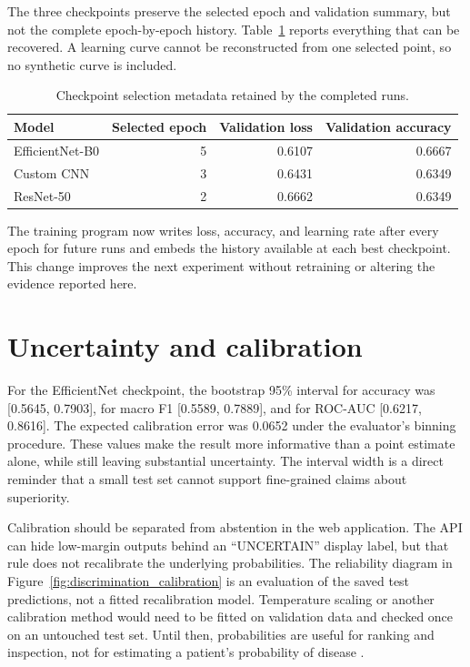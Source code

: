 The three checkpoints preserve the selected epoch and validation summary, but not the complete epoch-by-epoch history. Table~\ref{tab:checkpoint_selection} reports everything that can be recovered. A learning curve cannot be reconstructed from one selected point, so no synthetic curve is included.

\begin{table}[htbp]
\centering
\caption{Checkpoint selection metadata retained by the completed runs.}
\label{tab:checkpoint_selection}
\begin{tabular}{@{}lrrr@{}}
\toprule
\textbf{Model} & \textbf{Selected epoch} & \textbf{Validation loss} & \textbf{Validation accuracy} \\
\midrule
EfficientNet-B0 & 5 & 0.6107 & 0.6667 \\
Custom CNN & 3 & 0.6431 & 0.6349 \\
ResNet-50 & 2 & 0.6662 & 0.6349 \\
\bottomrule
\end{tabular}
\end{table}

The training program now writes loss, accuracy, and learning rate after every epoch for future runs and embeds the history available at each best checkpoint. This change improves the next experiment without retraining or altering the evidence reported here.

\section{Uncertainty and calibration}
For the EfficientNet checkpoint, the bootstrap 95\% interval for accuracy was [0.5645, 0.7903], for macro F1 [0.5589, 0.7889], and for ROC-AUC [0.6217, 0.8616]. The expected calibration error was 0.0652 under the evaluator's binning procedure. These values make the result more informative than a point estimate alone, while still leaving substantial uncertainty. The interval width is a direct reminder that a small test set cannot support fine-grained claims about superiority.

Calibration should be separated from abstention in the web application. The API can hide low-margin outputs behind an ``UNCERTAIN'' display label, but that rule does not recalibrate the underlying probabilities. The reliability diagram in Figure~\ref{fig:discrimination_calibration} is an evaluation of the saved test predictions, not a fitted recalibration model. Temperature scaling or another calibration method would need to be fitted on validation data and checked once on an untouched test set. Until then, probabilities are useful for ranking and inspection, not for estimating a patient's probability of disease \citep{Guo2017}.

